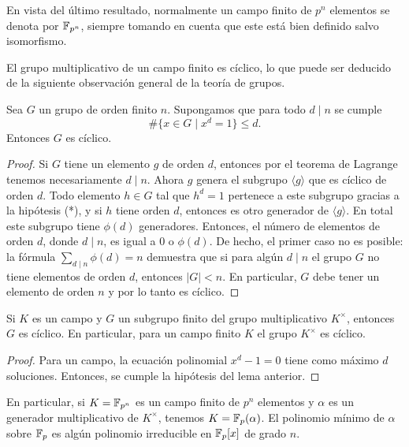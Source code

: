 En vista del último resultado, normalmente un campo finito de $p^n$ elementos se
denota por $\mathbb{F}_{p^n}$, siempre tomando en cuenta que este está bien definido
salvo isomorfismo.

\vspace{1em}

El grupo multiplicativo de un campo finito es cíclico, lo que puede ser deducido
de la siguiente observación general de la teoría de grupos.

\begin{lema}
  Sea $G$ un grupo de orden finito $n$. Supongamos que para todo
  $d\mid n$ se cumple
  \[ \tag{*} \# \{ x\in G \mid x^d = 1 \} \le d. \]
  Entonces $G$ es cíclico.

  \begin{proof}
    Si $G$ tiene un elemento $g$ de orden $d$, entonces por el teorema de
    Lagrange tenemos necesariamente $d \mid n$. Ahora $g$ genera el subgrupo
    $\langle g\rangle$ que es cíclico de orden $d$. Todo elemento $h\in G$ tal
    que $h^d = 1$ pertenece a este subgrupo gracias a la hipótesis (*), y si $h$
    tiene orden $d$, entonces es otro generador de $\langle g\rangle$. En total
    este subgrupo tiene $\phi (d)$ generadores. Entonces, el número de elementos
    de orden $d$, donde $d \mid n$, es igual a $0$ o $\phi (d)$. De hecho,
    el primer caso no es posible: la fórmula $\sum_{d\mid n} \phi (d) = n$
    demuestra que si para algún $d\mid n$ el grupo $G$ no tiene elementos de
    orden $d$, entonces $|G| < n$. En particular, $G$ debe tener un elemento de
    orden $n$ y por lo tanto es cíclico.
  \end{proof}
\end{lema}

\begin{corolario}
  Si $K$ es un campo y $G$ un subgrupo finito del grupo multiplicativo
  $K^\times$, entonces $G$ es cíclico. En particular, para un campo finito
  $K$ el grupo $K^\times$ es cíclico.

  \begin{proof}
    Para un campo, la ecuación polinomial $x^d - 1 = 0$ tiene como
    máximo $d$ soluciones. Entonces, se cumple la hipótesis
    del lema anterior.
  \end{proof}
\end{corolario}

En particular, si $K = \mathbb{F}_{p^n}$ es un campo finito de $p^n$ elementos y
$\alpha$ es un generador multiplicativo de $K^\times$, tenemos
$K = \mathbb{F}_p (\alpha)$. El polinomio mínimo de $\alpha$ sobre $\mathbb{F}_p$
es algún polinomio irreducible en $\mathbb{F}_p [x]$ de grado $n$.

